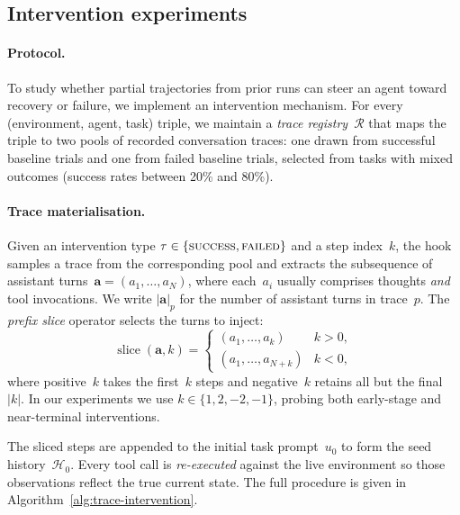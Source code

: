 \newpage
\subsection{Intervention experiments}
\label{app:interventions}

\paragraph{Protocol.} To study whether partial trajectories from prior runs can steer an agent toward recovery or failure, we implement an intervention mechanism. For every (environment, agent, task) triple, we maintain a \emph{trace registry}~$\mathcal{R}$ that maps the triple to two pools of recorded conversation traces: one drawn from successful baseline trials and one from failed baseline trials, selected from tasks with mixed outcomes (success rates between 20\% and 80\%).

  \paragraph{Trace materialisation.}
  Given an intervention type $\tau \in \{\textsc{success},
  \textsc{failed}\}$ and a step index~$k$, the hook samples a trace from
  the corresponding pool and extracts the subsequence of assistant
  turns~$\mathbf{a} = (a_1, \dots, a_N)$, where each~$a_i$ usually comprises
  thoughts \emph{and} tool invocations.  We write
  $|\mathbf{a}|_p$ for the number of assistant turns in trace~$p$.  The
  \emph{prefix slice} operator selects the turns to inject:
  \begin{equation}
    \operatorname{slice}(\mathbf{a}, k) =
    \begin{cases}
      (a_1, \dots, a_k)        & k > 0, \\[4pt]
      (a_1, \dots, a_{N+k})    & k < 0,
    \end{cases}
    \label{eq:slice}
  \end{equation}
  where positive~$k$ takes the first~$k$ steps and negative~$k$ retains
  all but the final~$|k|$.  In our experiments we use
  $k \in \{1, 2, -2, -1\}$, probing both early-stage and near-terminal
  interventions.

  The sliced steps are appended to the initial task prompt~$u_0$ to form
  the seed history~$\mathcal{H}_0$.  
  Every tool call is \emph{re-executed} against the live environment so
  those observations reflect the true current state.  The full procedure is
  given in Algorithm~\ref{alg:trace-intervention}.

